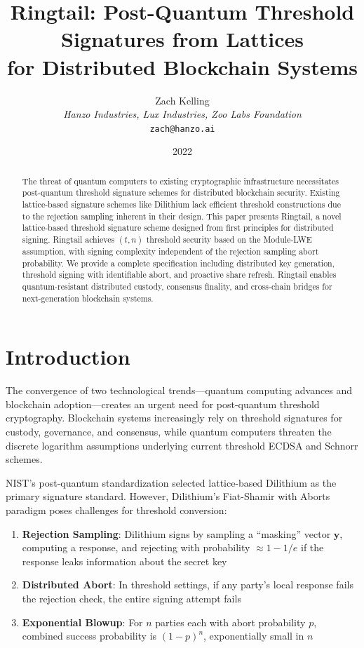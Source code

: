 \documentclass[11pt,a4paper]{article}
\title{Ringtail: Post-Quantum Threshold Signatures from Lattices\\for Distributed Blockchain Systems}
\author{Zach Kelling\\
\textit{Hanzo Industries, Lux Industries, Zoo Labs Foundation}\\
\texttt{zach@hanzo.ai}}
\date{2022}
\begin{document}
\maketitle

\begin{abstract}
The threat of quantum computers to existing cryptographic infrastructure necessitates post-quantum threshold signature schemes for distributed blockchain security. Existing lattice-based signature schemes like Dilithium lack efficient threshold constructions due to the rejection sampling inherent in their design. This paper presents Ringtail, a novel lattice-based threshold signature scheme designed from first principles for distributed signing. Ringtail achieves $(t,n)$ threshold security based on the Module-LWE assumption, with signing complexity independent of the rejection sampling abort probability. We provide a complete specification including distributed key generation, threshold signing with identifiable abort, and proactive share refresh. Ringtail enables quantum-resistant distributed custody, consensus finality, and cross-chain bridges for next-generation blockchain systems.
\end{abstract}

\section{Introduction}

The convergence of two technological trends---quantum computing advances and blockchain adoption---creates an urgent need for post-quantum threshold cryptography. Blockchain systems increasingly rely on threshold signatures for custody, governance, and consensus, while quantum computers threaten the discrete logarithm assumptions underlying current threshold ECDSA and Schnorr schemes.

NIST's post-quantum standardization selected lattice-based Dilithium as the primary signature standard. However, Dilithium's Fiat-Shamir with Aborts paradigm poses challenges for threshold conversion:

\begin{enumerate}
    \item \textbf{Rejection Sampling}: Dilithium signs by sampling a ``masking'' vector $\mathbf{y}$, computing a response, and rejecting with probability $\approx 1 - 1/e$ if the response leaks information about the secret key
    \item \textbf{Distributed Abort}: In threshold settings, if any party's local response fails the rejection check, the entire signing attempt fails
    \item \textbf{Exponential Blowup}: For $n$ parties each with abort probability $p$, combined success probability is $(1-p)^n$, exponentially small in $n$
\end{enumerate}
\end{document}
